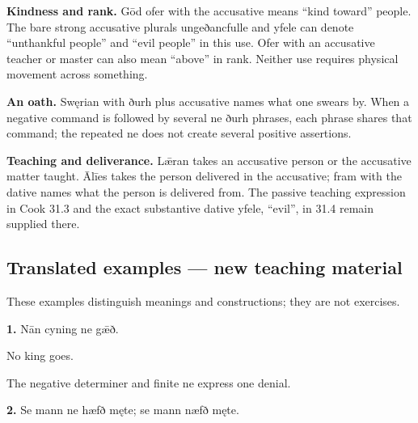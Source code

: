 \textbf{Kindness and rank.} Gōd ofer with the accusative means “kind toward” people. The bare strong accusative plurals ungeðancfulle and yfele can denote “unthankful people” and “evil people” in this use. Ofer with an accusative teacher or master can also mean “above” in rank. Neither use requires physical movement across something.

\textbf{An oath.} Swęrian with ðurh plus accusative names what one swears by. When a negative command is followed by several ne ðurh phrases, each phrase shares that command; the repeated ne does not create several positive assertions.

\textbf{Teaching and deliverance.} Lǣran takes an accusative person or the accusative matter taught. Ālīes takes the person delivered in the accusative; fram with the dative names what the person is delivered from. The passive teaching expression in Cook 31.3 and the exact substantive dative yfele, “evil”, in 31.4 remain supplied there.

\subsection*{Translated examples — new teaching material}

These examples distinguish meanings and constructions; they are not exercises.

\textbf{1.} Nān cyning ne gǣð.

No king goes.

The negative determiner and finite ne express one denial.

\textbf{2.} Se mann ne hæfð męte; se mann næfð męte.

